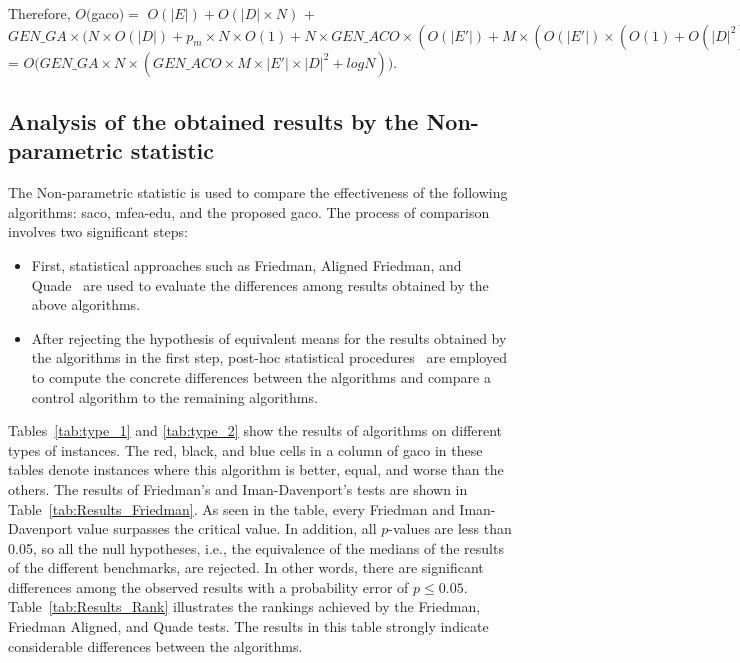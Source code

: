 Therefore, $O($\acrshort{gaco}$) = $
$O(|E|) + O(|D|\times N)$ + $GEN\_GA\times\bigg(N \times O(|D|) + p_{m}\times N\times O(1) + N\times GEN\_ACO\times (O(|E'|) + M\times (O(|E'|)\times (O(1)+O(|D|^2)))) + N\times O(logN))\bigg)$
= $O\bigg(GEN\_GA\times N\times (GEN\_ACO\times M\times|E'|\times|D|^2 +logN)\bigg)$.

\subsection{Analysis of the obtained results by the Non-parametric statistic}
The Non-parametric statistic is used to compare the effectiveness of the following algorithms: \acrshort{saco}, \acrshort{mfea-edu}, and the proposed \acrshort{gaco}. The process of comparison involves two significant steps:
\begin{itemize}
	\item First, statistical approaches such as Friedman, Aligned Friedman, and Quade~\cite{carrasco_recent_2020, derrac_practical_2011} are used to evaluate the differences among results obtained by the above algorithms.
	\item After rejecting the hypothesis of equivalent means for the results obtained by the algorithms in the first step, post-hoc statistical procedures~\cite{carrasco_recent_2020} are employed to compute the concrete differences between the algorithms and compare a control algorithm to the remaining algorithms.
\end{itemize}

Tables~\ref{tab:type_1} and \ref{tab:type_2} show the results of algorithms on different types of instances. The red, black, and blue cells in a column of \acrshort{gaco} in these tables denote instances where this algorithm is better, equal, and worse than the others.
The results of Friedman's and Iman-Davenport's tests are shown in Table~\ref{tab:Results_Friedman}. As seen in the table, every Friedman and Iman-Davenport value surpasses the critical value. In addition, all $p$-values are less than 0.05, so all the null hypotheses, i.e., the equivalence of the medians of the results of the different benchmarks, are rejected. In other words, there are significant differences among the observed results with a probability error of $p \leq 0.05$. Table~\ref{tab:Results_Rank} illustrates the rankings achieved by the Friedman, Friedman Aligned, and Quade tests. The results in this table strongly indicate considerable differences between the algorithms.

